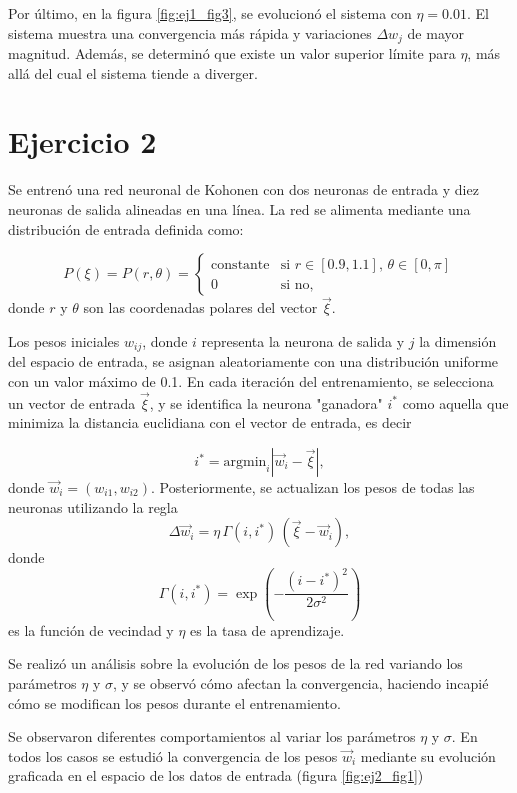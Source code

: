 \documentclass[aps,prb,twocolumn,superscriptaddress,floatfix,longbibliography]{revtex4-2}
\newcounter{para}
\begin{document}
Por último, en la figura \ref{fig:ej1_fig3}, se evolucionó el sistema con $\eta = 0.01$. El sistema muestra una convergencia más rápida y variaciones $\Delta w_j$ de mayor magnitud. Además, se determinó que existe un valor superior límite para $\eta$, más allá del cual el sistema tiende a diverger.

\section*{Ejercicio 2}

Se entrenó una red neuronal de Kohonen con dos neuronas de entrada y diez neuronas de salida alineadas en una línea. La red se alimenta mediante una distribución de entrada definida como:

\[ P(\xi) = P(r, \theta) = 
  \begin{cases} 
   \text{constante} & \text{si } r \in [0.9, 1.1], \, \theta \in [0, \pi] \\
   0 & \text{si no},
  \end{cases} \]
donde $r$ y $\theta$ son las coordenadas polares del vector $\vec{\xi}$.

Los pesos iniciales \(w_{ij}\), donde \(i\) representa la neurona de salida y \(j\) la dimensión del espacio de entrada, se asignan aleatoriamente con una distribución uniforme con un valor máximo de 0.1. En cada iteración del entrenamiento, se selecciona un vector de entrada \(\vec{\xi}\), y se identifica la neurona "ganadora" \(i^*\) como aquella que minimiza la distancia euclidiana con el vector de entrada, es decir

\[ i^* = \text{argmin}_i |\vec{w}_i - \vec{\xi}|, \]
donde $\vec{w}_i = (w_{i1}, w_{i2})$. Posteriormente, se actualizan los pesos de todas las neuronas utilizando la regla
\[ \Delta \vec{w}_i = \eta \, \Gamma(i, i^*) \, (\vec{\xi} - \vec{w}_i), \]
donde 
\[ \Gamma(i, i^*) = \exp\left( - \frac{(i - i^*)^2}{2 \sigma^2} \right) \]
es la función de vecindad y \(\eta\) es la tasa de aprendizaje.

Se realizó un análisis sobre la evolución de los pesos de la red variando los parámetros \(\eta\) y \(\sigma\), y se observó cómo afectan la convergencia, haciendo incapié cómo se modifican los pesos durante el entrenamiento.

Se observaron diferentes comportamientos al variar los parámetros \(\eta\) y \(\sigma\). En todos los casos se estudió la convergencia de los pesos $\vec{w}_i$ mediante su evolución graficada en el espacio de los datos de entrada (figura \ref{fig:ej2_fig1})
\end{document}
